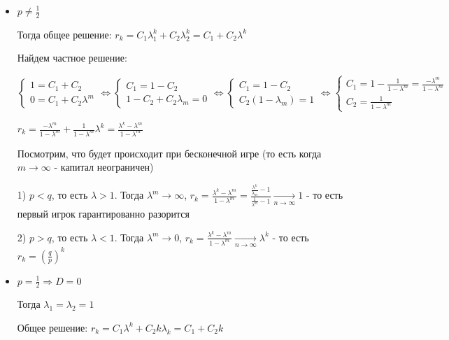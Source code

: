 \documentclass[12pt]{article}
\begin{document}
    \begin{itemize}
        \item $p \neq \frac{1}{2}$

        Тогда общее решение: $r_k = C_1 \lambda_1^k + C_2 \lambda_2^k = C_1 + C_2 \lambda^k$

        Найдем частное решение:

        $\begin{cases}
            1 = C_1 + C_2 \\
            0 = C_1 + C_2 \lambda^m
        \end{cases} \Longleftrightarrow \begin{cases}
            C_1 = 1 - C_2 \\
            1 - C_2 + C_2 \lambda_m = 0
        \end{cases} \Longleftrightarrow \begin{cases}
            C_1 = 1 - C_2 \\
            C_2 (1 - \lambda_m) = 1
        \end{cases} \Longleftrightarrow \begin{cases}
            C_1 = 1 - \frac{1}{1 - \lambda^m} = \frac{-\lambda^m}{1 - \lambda^m} \\
            C_2 = \frac{1}{1 - \lambda^m}
        \end{cases}$

        $r_k = \frac{-\lambda^m}{1 - \lambda^m} + \frac{1}{1 - \lambda^m} \lambda^k = \frac{\lambda^k - \lambda^m}{1 - \lambda^m}$

        Посмотрим, что будет происходит при бесконечной игре (то есть когда $m \to \infty$ - капитал неограничен)

        1) $p < q$, то есть $\lambda > 1$. Тогда $\lambda^m \to \infty$, $r_k = \frac{\lambda^k - \lambda^m}{1 - \lambda^m} = \frac{\frac{\lambda^k}{\lambda_m} - 1}{\frac{1}{\lambda^m} - 1} \underset{n \to \infty}{\longrightarrow} 1$ - 
        то есть первый игрок гарантированно разорится

        2) $p > q$, то есть $\lambda < 1$. Тогда $\lambda^m \to 0$, $r_k = \frac{\lambda^k - \lambda^m}{1 - \lambda^m} \underset{n \to \infty}{\longrightarrow} \lambda^k$ - 
        то есть $r_k = \left(\frac{q}{p}\right)^k$

        \item $p = \frac{1}{2} \Longrightarrow D = 0$ 

        Тогда $\lambda_1 = \lambda_2 = 1$

        Общее решение: $r_k = C_1 \lambda^k + C_2 k \lambda_k = C_1 + C_2 k$


\end{itemize}
\end{document}
